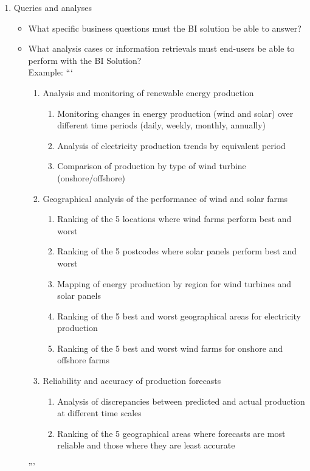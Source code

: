 \begin{enumerate}
    \item Queries and analyses
    \begin{itemize}
        \item What specific business questions must the BI solution be able to answer?
        \item What analysis cases or information retrievals must end-users be able to perform with the BI Solution? \\
        Example: ```
        \begin{enumerate}
            \item Analysis and monitoring of renewable energy production
                \begin{enumerate}
                    \item Monitoring changes in energy production (wind and solar) over different time periods (daily, weekly, monthly, annually)
                    \item Analysis of electricity production trends by equivalent period
                    \item Comparison of production by type of wind turbine (onshore/offshore)
                \end{enumerate}
            \item Geographical analysis of the performance of wind and solar farms
                \begin{enumerate}
                    \item Ranking of the 5 locations where wind farms perform best and worst
                    \item Ranking of the 5 postcodes where solar panels perform best and worst
                    \item Mapping of energy production by region for wind turbines and solar panels
                    \item Ranking of the 5 best and worst geographical areas for electricity production
                    \item Ranking of the 5 best and worst wind farms for onshore and offshore farms
                \end{enumerate}
            \item Reliability and accuracy of production forecasts
                \begin{enumerate}
                    \item Analysis of discrepancies between predicted and actual production at different time scales
                    \item Ranking of the 5 geographical areas where forecasts are most reliable and those where they are least accurate
                \end{enumerate}
        \end{enumerate}
        '''
    \end{itemize}


\end{enumerate}

